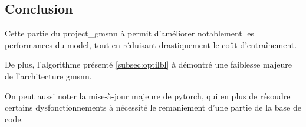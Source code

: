 \subsection{Conclusion}
Cette partie du \gls{project_gmsnn} à permit d'améliorer notablement les performances du \gls{model}, tout en réduisant drastiquement le coût d'entraînement.%

De plus, l'algorithme présenté \autoref{subsec:optilbl} à démontré une faiblesse majeure de l'architecture \gls{gmsnn}.

On peut aussi noter la mise-à-jour majeure de \gls{pytorch}, qui en plus de résoudre certains dysfonctionnements à nécessité le remaniement d'une partie de la base de code.
